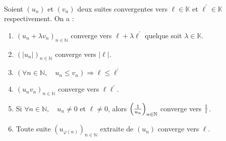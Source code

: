     \begin{theorem}
        \ \\
        \label{theorem:ops_suites_convergentes}
        Soient \((u_n)\) et \((v_n)\) deux suites convergentes vers \(\ell\in\mathbb{K}\) et \(\ell^{\prime}\in\mathbb{K}\) respectivement. On a :
        \begin{enumerate}[label=(\roman*)]
            \item \((u_n + \lambda v_n)_{n\in\mathbb{N}}\) converge vers \(\ell + \lambda \ell^{\prime}\) quelque soit \(\lambda\in\mathbb{K}\). 
            \item \((|u_n|)_{n\in\mathbb{N}}\) converge vers \(|\ell|\).
            \item \((\forall n \in \mathbb{N}, \quad u_n \le v_n) \Rightarrow \ell \le \ell^{\prime}\)
            \item \((u_nv_n)_{n\in\mathbb{N}}\) converge vers \(\ell\ell^{\prime}\).
            \item Si \(\forall n \in \mathbb{N}, \quad u_n \neq 0\) et \(\ell\neq 0\), alors \({\left({1\over u_n}\right)}_{n\in\mathbb{N}}\) converge vers \({1\over l}\).
            \item Toute suite \((u_{\varphi(n)})_{n\in\mathbb{N}}\) extraite de \((u_n)\) converge vers \(\ell\). 
        \end{enumerate}
    \end{theorem}

